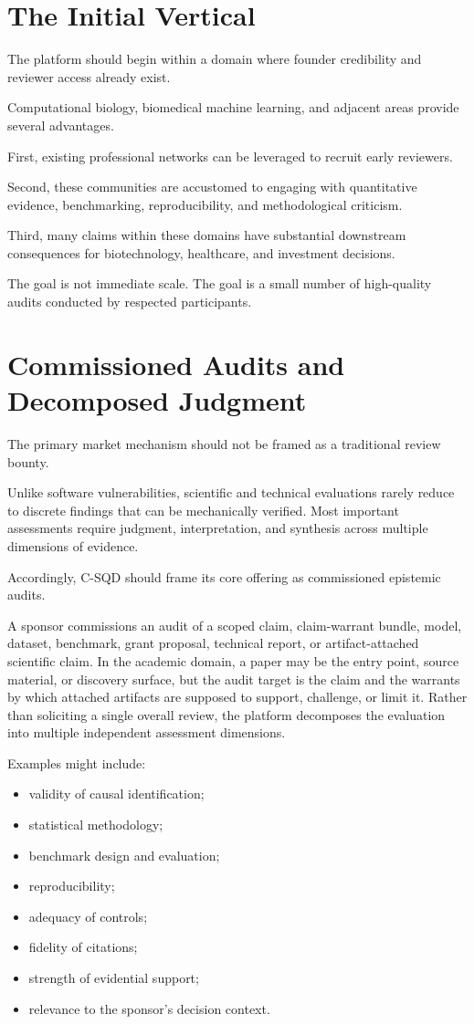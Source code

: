 \documentclass[11pt]{article}
\begin{document}
\section{The Initial Vertical}

The platform should begin within a domain where founder credibility and reviewer access already exist.

Computational biology, biomedical machine learning, and adjacent areas provide several advantages.

First, existing professional networks can be leveraged to recruit early reviewers.

Second, these communities are accustomed to engaging with quantitative evidence, benchmarking, reproducibility, and methodological criticism.

Third, many claims within these domains have substantial downstream consequences for biotechnology, healthcare, and investment decisions.

The goal is not immediate scale. The goal is a small number of high-quality audits conducted by respected participants.

\section{Commissioned Audits and Decomposed Judgment}

The primary market mechanism should not be framed as a traditional review bounty.

Unlike software vulnerabilities, scientific and technical evaluations rarely reduce to discrete findings that can be mechanically verified. Most important assessments require judgment, interpretation, and synthesis across multiple dimensions of evidence.

Accordingly, C-SQD should frame its core offering as commissioned epistemic audits.

A sponsor commissions an audit of a scoped claim, claim-warrant bundle, model, dataset, benchmark, grant proposal, technical report, or artifact-attached scientific claim. In the academic domain, a paper may be the entry point, source material, or discovery surface, but the audit target is the claim and the warrants by which attached artifacts are supposed to support, challenge, or limit it. Rather than soliciting a single overall review, the platform decomposes the evaluation into multiple independent assessment dimensions.

Examples might include:

\begin{itemize}
\item validity of causal identification;
\item statistical methodology;
\item benchmark design and evaluation;
\item reproducibility;
\item adequacy of controls;
\item fidelity of citations;
\item strength of evidential support;
\item relevance to the sponsor's decision context.
\end{itemize}
\end{document}
